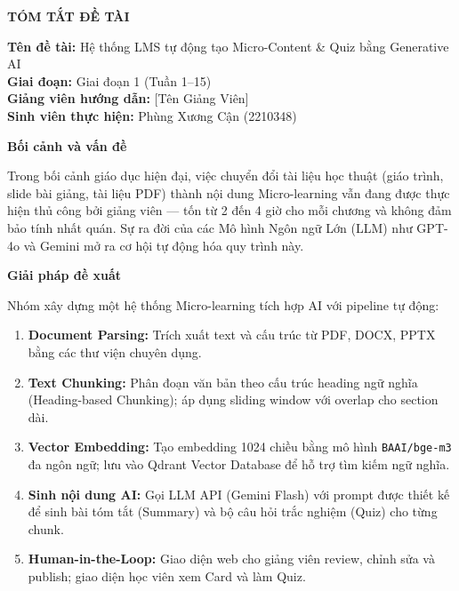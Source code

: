 \thispagestyle{fancy}
\begin{center}
    \textbf{\Large TÓM TẮT ĐỀ TÀI}
\end{center}

\vspace{0.5cm}

\noindent\textbf{Tên đề tài:} Hệ thống LMS tự động tạo Micro-Content \& Quiz
bằng Generative AI\\[4pt]
\noindent\textbf{Giai đoạn:} Giai đoạn 1 (Tuần 1--15)\\[4pt]
\noindent\textbf{Giảng viên hướng dẫn:} [Tên Giảng Viên]\\[4pt]
\noindent\textbf{Sinh viên thực hiện:} Phùng Xương Cận (2210348)

\vspace{0.7cm}

\noindent\textbf{\large Bối cảnh và vấn đề}

\vspace{0.3cm}

Trong bối cảnh giáo dục hiện đại, việc chuyển đổi tài liệu học thuật (giáo
trình, slide bài giảng, tài liệu PDF) thành nội dung Micro-learning vẫn đang
được thực hiện thủ công bởi giảng viên --- tốn từ 2 đến 4 giờ cho mỗi chương
và không đảm bảo tính nhất quán. Sự ra đời của các Mô hình Ngôn ngữ Lớn
(LLM) như GPT-4o và Gemini mở ra cơ hội tự động hóa quy trình này.

\vspace{0.5cm}

\noindent\textbf{\large Giải pháp đề xuất}

\vspace{0.3cm}

Nhóm xây dựng một hệ thống Micro-learning tích hợp AI với pipeline tự động:

\begin{enumerate}
    \item \textbf{Document Parsing:} Trích xuất text và cấu trúc từ PDF, DOCX,
          PPTX bằng các thư viện chuyên dụng.
    \item \textbf{Text Chunking:} Phân đoạn văn bản theo cấu trúc heading ngữ
          nghĩa (Heading-based Chunking); áp dụng sliding window với overlap
          cho section dài.
    \item \textbf{Vector Embedding:} Tạo embedding 1024 chiều bằng mô hình
          \texttt{BAAI/bge-m3} đa ngôn ngữ; lưu vào Qdrant Vector Database để
          hỗ trợ tìm kiếm ngữ nghĩa.
    \item \textbf{Sinh nội dung AI:} Gọi LLM API (Gemini Flash) với prompt
          được thiết kế để sinh bài tóm tắt (Summary) và bộ câu hỏi trắc
          nghiệm (Quiz) cho từng chunk.
    \item \textbf{Human-in-the-Loop:} Giao diện web cho giảng viên review,
          chỉnh sửa và publish; giao diện học viên xem Card và làm Quiz.
\end{enumerate}

